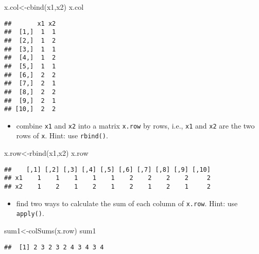 \documentclass[
]{article}
\newenvironment{Shaded}{\begin{snugshade}}{\end{snugshade}}
\newcommand{\FunctionTok}[1]{\textcolor[rgb]{0.00,0.00,0.00}{#1}}
\newcommand{\NormalTok}[1]{#1}
\newcommand{\OtherTok}[1]{\textcolor[rgb]{0.56,0.35,0.01}{#1}}
\providecommand{\tightlist}{%
  \setlength{\itemsep}{0pt}\setlength{\parskip}{0pt}}
\begin{document}
\begin{Shaded}
\begin{Highlighting}[]
\NormalTok{x.col}\OtherTok{\textless{}{-}}\FunctionTok{cbind}\NormalTok{(x1,x2)}
\NormalTok{x.col}
\end{Highlighting}
\end{Shaded}

\begin{verbatim}
##       x1 x2
##  [1,]  1  1
##  [2,]  1  2
##  [3,]  1  1
##  [4,]  1  2
##  [5,]  1  1
##  [6,]  2  2
##  [7,]  2  1
##  [8,]  2  2
##  [9,]  2  1
## [10,]  2  2
\end{verbatim}

\begin{itemize}
\tightlist
\item
  combine \texttt{x1} and \texttt{x2} into a matrix \texttt{x.row} by
  rows, i.e., \texttt{x1} and \texttt{x2} are the two rows of
  \texttt{x}. Hint: use \texttt{rbind()}.
\end{itemize}

\begin{Shaded}
\begin{Highlighting}[]
\NormalTok{x.row}\OtherTok{\textless{}{-}}\FunctionTok{rbind}\NormalTok{(x1,x2)}
\NormalTok{x.row}
\end{Highlighting}
\end{Shaded}

\begin{verbatim}
##    [,1] [,2] [,3] [,4] [,5] [,6] [,7] [,8] [,9] [,10]
## x1    1    1    1    1    1    2    2    2    2     2
## x2    1    2    1    2    1    2    1    2    1     2
\end{verbatim}

\begin{itemize}
\tightlist
\item
  find two ways to calculate the sum of each column of \texttt{x.row}.
  Hint: use \texttt{apply()}.
\end{itemize}

\begin{Shaded}
\begin{Highlighting}[]
\NormalTok{sum1}\OtherTok{\textless{}{-}}\FunctionTok{colSums}\NormalTok{(x.row)}
\NormalTok{sum1}
\end{Highlighting}
\end{Shaded}

\begin{verbatim}
##  [1] 2 3 2 3 2 4 3 4 3 4
\end{verbatim}
\end{document}
